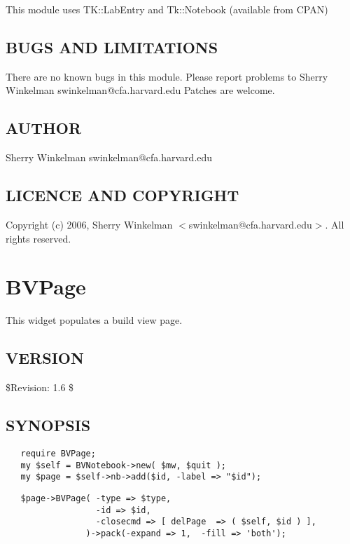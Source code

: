 \documentclass{article}
\begin{document}
This module uses TK::LabEntry and Tk::Notebook (available from CPAN)

\subsection*{BUGS AND LIMITATIONS\label{BVNotebook_BUGS_AND_LIMITATIONS}}


There are no known bugs in this module.
Please report problems to Sherry Winkelman swinkelman@cfa.harvard.edu
Patches are welcome.

\subsection*{AUTHOR\label{BVNotebook_AUTHOR}}


Sherry Winkelman swinkelman@cfa.harvard.edu

\subsection*{LICENCE AND COPYRIGHT\label{BVNotebook_LICENCE_AND_COPYRIGHT}}


Copyright (c) 2006, Sherry Winkelman $<$swinkelman@cfa.harvard.edu$>$. All rights 
reserved.

\clearpage
\section{BVPage\label{BVPage}}


This widget populates a build view page.

\subsection*{VERSION\label{BVPage_VERSION}}


\$Revision: 1.6 \$

\subsection*{SYNOPSIS\label{BVPage_SYNOPSIS}}
\begin{verbatim}
   require BVPage;
   my $self = BVNotebook->new( $mw, $quit );
   my $page = $self->nb->add($id, -label => "$id");
\end{verbatim}
\begin{verbatim}
   $page->BVPage( -type => $type,
                  -id => $id,
                  -closecmd => [ delPage  => ( $self, $id ) ],
                )->pack(-expand => 1,  -fill => 'both');
\end{verbatim}
\end{document}
